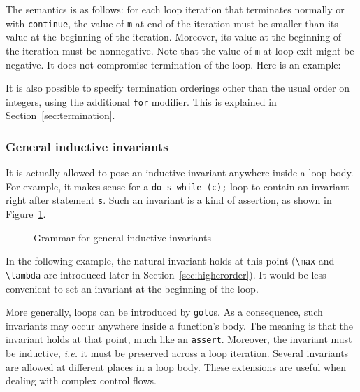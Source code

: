 The semantics is as follows: for each loop iteration that terminates
normally or with \lstinline|continue|, the value of \lstinline|m| at end of the
iteration must be smaller than its value at the beginning of the
iteration. Moreover, its value at the beginning of the iteration
must be nonnegative. Note that the value of \lstinline|m| at loop exit might be
negative. It does not compromise termination of the
loop. Here is an example:

\begin{example}
  \hspace{0pt}
  \label{ex:loopvariant}
\end{example}

It is also possible to specify termination orderings other than the
usual order on integers, using the additional \lstinline|for|
modifier. This is explained in Section~\ref{sec:termination}.

\subsubsection{General inductive invariants}
It is actually allowed to pose an inductive invariant
anywhere inside a loop body.
For example, it makes sense for a
\lstinline|do s while (c);| loop to contain an invariant right after statement
\lstinline|s|. Such an invariant is a kind of assertion, as
shown in Figure~\ref{fig:advancedinvariants}.

\begin{figure}[t]
  \begin{cadre}
    
  \end{cadre}
  \caption{Grammar for general inductive invariants}
  \label{fig:advancedinvariants}
\end{figure}

\begin{example}
  In the following example, the natural invariant holds at this point
  (\lstinline!\max! and \lstinline!\lambda! are introduced later in
  Section~\ref{sec:higherorder}).
  It would be less convenient to set an invariant at the beginning
  of the loop.
\end{example}

More generally, loops can be introduced by \lstinline|goto|s.
As a consequence, such invariants may occur anywhere
inside a function's body. The meaning is that the invariant
holds at that point, much like an \lstinline{assert}. Moreover, the
invariant must be inductive, \emph{i.e.} it must be preserved across a
loop iteration. Several invariants are allowed at different places in
a loop body. These extensions are useful when dealing with complex
control flows.

